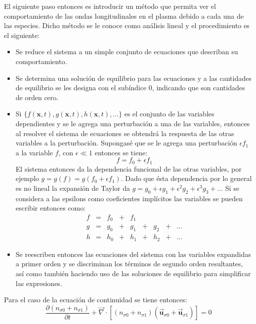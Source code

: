 \documentclass[../tesis_main_file.tex]{subfiles}
\begin{document}
El siguiente paso entonces es introducir un método que permita ver el comportamiento de las ondas longitudinales en el  plasma debido a cada una de las especies. Dicho método se le conoce como análisis lineal y el procedimiento es el siguiente:
\begin{itemize}
\item Se reduce el sistema a un simple conjunto de ecuaciones que describan su comportamiento.
\item Se determina una solución de equilibrio para las ecuaciones y a las cantidades de equilibrio se les designa con el subíndice 0, indicando que son cantidades de orden cero.
\item Si $\lbrace f(\textbf{x},t), g(\textbf{x},t),h(\textbf{x},t),...\rbrace$ es el conjunto de las variables dependientes y se le agrega una perturbación a una de las variables, entonces al resolver el sistema de ecuaciones se obtendrá la respuesta de las otras variables a la perturbación. Supongasé que se le agrega una perturbación $\epsilon f_1$ a la variable $f$, con $\epsilon \ll 1$ entonces se tiene:
\begin{equation*}
f = f_0 + \epsilon f_1
\end{equation*}
El sistema entonces da la dependencia funcional de las otras variables, por ejemplo $g = g(f) = g(f_0 + \epsilon f_1)$. Dado que ésta dependencia por lo general es no lineal la expansión de Taylor da $g = g_0 + \epsilon g_1 + \epsilon^2 g_2 + \epsilon^3 g_3 +...$ Si se considera a las epsilons como coeficientes implícitos las variables se pueden escribir entonces como:
$$
\begin{array}{lllllllll}
f &= &f_0 &+ &f_1 \\
g &= &g_0 &+ &g_1 &+ &g_2 &+ &...\\
h &= &h_0 &+ &h_1 &+ &h_2 &+ &...
\end{array}
$$
\item Se reescriben entonces las ecuaciones del sistema con las variables expandidas a primer orden y se discriminan los términos de segundo orden resultantes, así como también haciendo uso de las soluciones de equilibrio para simplificar las expresiones.
\end{itemize}
Para el caso de la ecuación de continuidad se tiene entonces:
\begin{equation}
\frac{\partial (n_{\sigma 0} + n_{\sigma 1})}{\partial t} + \overrightarrow{\nabla} \cdot [(n_{\sigma 0}+n_{\sigma 1})(\overrightarrow{\textbf{u}}_{\sigma 0} + \overrightarrow{\textbf{u}}_{\sigma 1})]=0
\end{equation}
\end{document}
